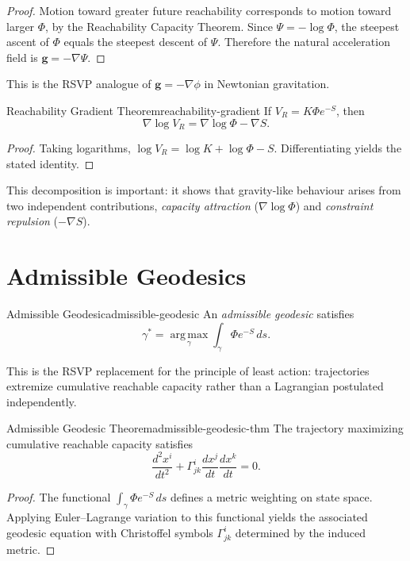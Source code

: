 \documentclass[12pt,twoside,openright]{book}
\begin{document}
\begin{proof}
  Motion toward greater future reachability corresponds to
  motion toward larger $\Phi$, by the Reachability Capacity
  Theorem. Since $\Psi = -\log\Phi$, the steepest ascent of
  $\Phi$ equals the steepest descent of $\Psi$. Therefore
  the natural acceleration field is $\mathbf{g} = -\nabla\Psi$.
\end{proof}

This is the RSVP analogue of $\mathbf{g} = -\nabla\phi$ in
Newtonian gravitation.

\begin{theorem}{Reachability Gradient Theorem}{reachability-gradient}
  If $V_R = K\Phi e^{-S}$, then
  \[
    \nabla \log V_R = \nabla\log\Phi - \nabla S.
  \]
\end{theorem}

\begin{proof}
  Taking logarithms, $\log V_R = \log K + \log\Phi - S$.
  Differentiating yields the stated identity.
\end{proof}

This decomposition is important: it shows that
gravity-like behaviour arises from two independent
contributions, \emph{capacity attraction} ($\nabla\log\Phi$)
and \emph{constraint repulsion} ($-\nabla S$).

\section{Admissible Geodesics}
\label{sec:ch17-geodesics}

\begin{definition}{Admissible Geodesic}{admissible-geodesic}
  An \emph{admissible geodesic} satisfies
  \[
    \gamma^* = \operatorname*{arg\,max}_\gamma
    \int_\gamma \Phi e^{-S} \, ds.
  \]
\end{definition}

This is the RSVP replacement for the principle of least
action: trajectories extremize cumulative reachable
capacity rather than a Lagrangian postulated independently.

\begin{theorem}{Admissible Geodesic Theorem}{admissible-geodesic-thm}
  The trajectory maximizing cumulative reachable capacity
  satisfies
  \[
    \frac{d^2 x^i}{dt^2}
    + \Gamma^i_{jk}\frac{dx^j}{dt}\frac{dx^k}{dt} = 0.
  \]
\end{theorem}

\begin{proof}
  The functional $\int_\gamma \Phi e^{-S}\,ds$ defines a
  metric weighting on state space. Applying Euler--Lagrange
  variation to this functional yields the associated
  geodesic equation with Christoffel symbols
  $\Gamma^i_{jk}$ determined by the induced metric.
\end{proof}
\end{document}
